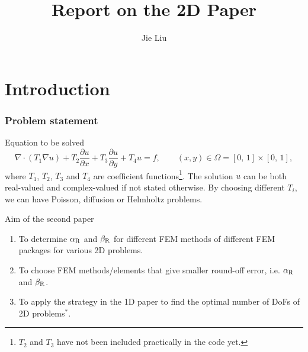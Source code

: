 \documentclass{beamer}
\title[]{Report on the 2D Paper}
\institute[]{Delft University of Technology, the Netherlands}
\author{Jie Liu}
\begin{document}
{
\frame{\titlepage}
}

\section{Introduction}
\begin{frame}
\frametitle{Problem statement}
\vspace{-7em}
\begin{block}{Equation to be solved}
\scriptsize
\begin{equation}
 \nabla \cdot (T_1 \nabla u) + T_2 \frac{\partial{u}}{\partial{x}} + T_3 \frac{\partial{u}}{\partial{y}} + T_4 u = f,\qquad (x,y) \in \Omega = [0,\,1] \times [0,\,1],
 \label{problem_to_be_investigated}
\end{equation}
where $T_1$, $T_2$, $T_3$ and $T_4$ are coefficient functions\footnote{$T_2$ and $T_3$ have not been included practically in the code yet.}. The solution $u$ can be both real-valued and complex-valued if not stated otherwise. By choosing different $T_i$, we can have Poisson, diffusion or Helmholtz problems.
\end{block}
\end{frame}

\begin{frame}{Aim of the second paper}
\vspace{-8em}
\begin{enumerate}
 \item To determine $\alpha_{\rm R}$ and $\beta_{\rm R}$ for different FEM methods of different FEM packages for various 2D problems.
 \item To choose FEM methods/elements that give smaller round-off error, i.e. $\alpha_{\rm R}$ and $\beta_{\rm R}$.
 \item To apply the strategy in the 1D paper to find the optimal number of DoFs of 2D problems$^{*}$.
\end{enumerate}
\end{frame}
\end{document}
